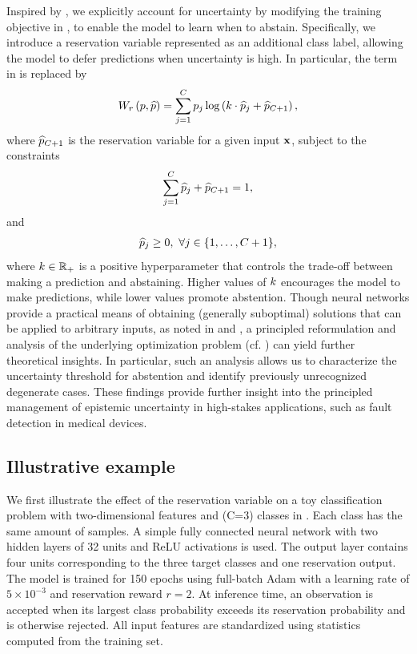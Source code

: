 Inspired by \cite{chow1970optimum,markowitz1952portfolio,liu2019deep}, we explicitly account for uncertainty by modifying the training objective in , to enable the model to learn when to abstain. Specifically, we introduce a reservation variable represented as an additional class label, allowing the model to defer predictions when uncertainty is high. In particular, the term in  is replaced by
\begin{align}
    \label{eq:reject_cross_entropy_internal}
    \W{r}=\sum_{j=1}^{C} p_{j}\log\left(\costmult\cdot\phat_{j}+\phat_{C+1}\right),
\end{align}
where \(\widehat{p}_{C+1}\) is the reservation variable for a given input \(\mathbf{x}\), subject to the constraints
\begin{align}
    \label{eq:reject_cross_entropy_sum}
    \sum_{j=1}^{C} \widehat{p}_{j}+\widehat{p}_{C+1}=1,
\end{align}
and
\begin{align}
    \label{eq:reject_cross_entropy_nonneg}
    \widehat{p}_j\ge 0,\ \forall j\in\{1,\ldots,C+1\},
\end{align}
where \(k\in\mathbb{R}_{+}\) is a positive hyperparameter that controls the trade-off between making a prediction and abstaining. Higher values of \(k\) encourages the model to make predictions, while lower values promote abstention.
Though neural networks provide a practical means of obtaining (generally suboptimal) solutions that can be applied to arbitrary inputs, as noted in \cite{Hornik1991} and \cite{liu2019deep}, a principled reformulation and analysis of the underlying optimization problem (cf. \cite{boyd2004convex}) can yield further theoretical insights. In particular, such an analysis allows us to characterize the uncertainty threshold for abstention and identify previously unrecognized degenerate cases. These findings provide further insight into the principled management of epistemic uncertainty in high-stakes applications, such as fault detection in medical devices.

\subsection{Illustrative example}
\label{subsec:illustrative_example}
We first illustrate the effect of the reservation variable on a toy classification problem with two-dimensional features and (C=3) classes in . Each class has the same amount of samples. A simple fully connected neural network with two hidden layers of 32 units and ReLU activations is used. The output layer contains four units corresponding to the three target classes and one reservation output. The model is trained for 150 epochs using full-batch Adam with a learning rate of \(5\times10^{-3}\) and reservation reward \(r=2\). At inference time, an observation is accepted when its largest class probability exceeds its reservation probability and is otherwise rejected. All input features are standardized using statistics computed from the training set.

